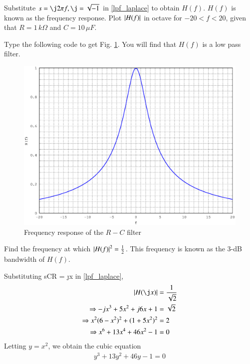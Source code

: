 %
\begin{problem}
Substitute $s = \j 2\pi f, \j =  \sqrt{-1}$ in \eqref{lpf_laplace} to obtain $H(f)$.  $H(f)$ is known as the frequency response. Plot $\left\vert H(f)\right\vert$ in octave for $-20 < f < 20$, given that $R = 1 \,k\Omega$ and $C = 10 \,\mu F$.
\end{problem}
%
\solution 
%
Type  the following code to get Fig. \ref{fig:filter_plot}.  You will find that $H(f)$ is a low pass
filter.
%

%
\begin{figure}[!h]
\centering
\includegraphics[width=\columnwidth]{chapter2/figs/2.2.eps}
\caption{Frequency response of the $R-C$ filter}
\label{fig:filter_plot}
\end{figure}
\begin{problem}
Find the frequency at which $\left\vert H(f)\right\vert^2 = \frac{1}{2}$. This frequency is
known as the 3-dB bandwidth of $H(f)$.
\end{problem}
%
\solution Substituting sCR = \j x in \eqref{lpf_laplace},
%
\begin{align}
 \abs{H(\j x)} &= \frac{1}{\sqrt{2}} \\
 \Rightarrow 
 -jx^3 + 5x^2 +j6x + 1 &= \sqrt{2} \\
\Rightarrow 
 x^2(6-x^2)^2 + (1+5x^2)^2 &= 2 \\
 \Rightarrow 
x^6 + 13x^4 + 46x^2 -1&= 0 \\
\end{align}
%
Letting $y=x^2$, we obtain the cubic equation
%
\begin{align}
y^3 + 13y^2 + 46 y -1 = 0
\end{align}
